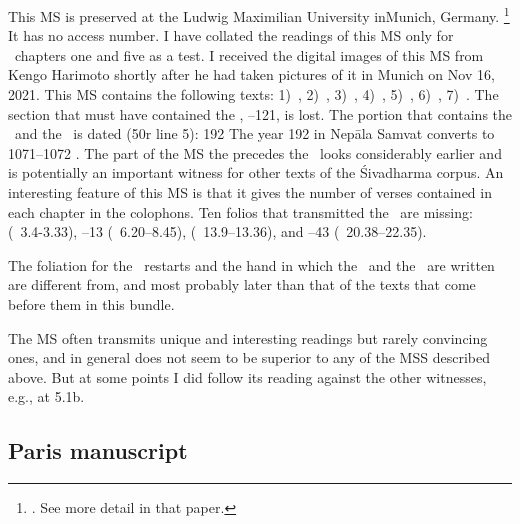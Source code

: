 This MS is preserved at the Ludwig Maximilian University
in\linebreak \mbox{Munich}, Germany.%
			\footnote{. 
			See more detail in that paper.}
It has no access number.
I have collated the readings of this MS only for \VSS\ 
chapters one and five as a test.
I received the digital images of this MS from Kengo Harimoto
shortly after he had taken pictures of it in Munich on  Nov 16, 2021. 
This MS contains the following texts:
1)~\SDhS, 
2)~\SDhU, 
3)~\Ums,
4)~\SivaUp,
5)~\Vss, 
6)~\Uums,
7)~\DharmP.
The section that must have contained the \SDhSangr, --121, is lost. 
The portion that contains the \VSS\ and the \DharmP\
is dated (\fol50r line 5):  192  The year 192 in Nepāla Samvat converts to 
1071--1072 \CE. The part of the MS the precedes the \VSS\ looks
considerably earlier and is potentially an important witness for
other texts of the Śivadharma corpus. An interesting 
feature of this MS is that it gives the number of verses contained in
each chapter in the colophons. Ten folios that transmitted the \VSS\
are missing: 
\fol5 (\VSS\ 3.4-3.33),
\fols11--13 (\VSS\ 6.20--8.45),
\fols24 (\VSS\ 13.9--13.36), and
\fols39--43 (\VSS\ 20.38--22.35). 

The foliation for the \VSS\ restarts
and the hand in which the \VSS\ and the \DharmP\ are written are different from, and
most probably later than that of the texts that come 
before them in this bundle. 

The MS often transmits unique and interesting readings
but rarely convincing ones, and in general does not seem to be superior 
to any of the MSS described above. But at some points
I did follow its reading against the other witnesses, e.g., at 5.1b.


\medskip
\subsection{Paris manuscript}

